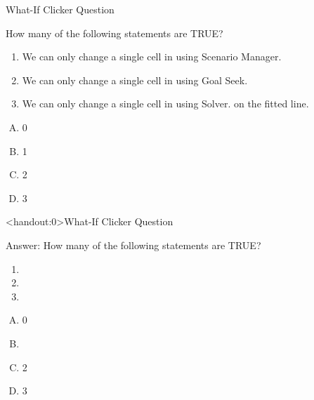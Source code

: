 \documentclass[xcolor=svgnames]{beamer}
\begin{document}
\begin{frame}{What-If Clicker Question}
  \begin{example}
 How many of the following statements are TRUE?
 \begin{enumerate}
\item We can only change a single cell in using Scenario Manager.
\item We can only change a single cell in using Goal Seek.
\item We can only change a single cell in using Solver.
on the fitted line.
 \end{enumerate}
\begin{multicols}{4}
\begin{enumerate}[A)]
\item 0 
\item 1
\item 2
\item 3
\end{enumerate}
\end{multicols}
  \end{example} 
\end{frame}

\begin{frame}<handout:0>{What-If Clicker Question}
  \begin{block}{Answer:}
 How many of the following statements are TRUE?
 \begin{enumerate}
\item {}
\item {}
\item {}
 \end{enumerate}
\begin{multicols}{5}
\begin{enumerate}[A)]
\item 0 
\item \textbf<4>{\textit<4>{{}}}
\item 2
\item 3
\end{enumerate}
\end{multicols}
  \end{block} 
\end{frame}
\end{document}

